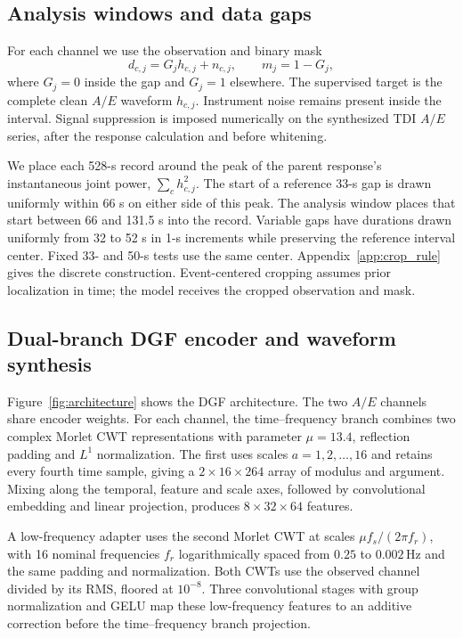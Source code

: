\documentclass[10pt,prd,aps,a4paper,twocolumn,superscriptaddress,nofootinbib,floatfix]{revtex4-2}
\begin{document}
\subsection{Analysis windows and data gaps}\label{sec:gaps}
For each channel we use the observation and binary mask
\begin{equation}
d_{c,j}=G_jh_{c,j}+n_{c,j},\qquad m_j=1-G_j,\label{eq:observation}
\end{equation}
where $G_j=0$ inside the gap and $G_j=1$ elsewhere. The supervised target is the complete clean $A/E$ waveform $h_{c,j}$. Instrument noise remains present inside the interval. Signal suppression is imposed numerically on the synthesized TDI $A/E$ series, after the response calculation and before whitening.

We place each 528-s record around the peak of the parent response's instantaneous joint power, $\sum_c h_{c,j}^2$. The start of a reference 33-s gap is drawn uniformly within 66 s on either side of this peak. The analysis window places that start between 66 and 131.5 s into the record. Variable gaps have durations drawn uniformly from 32 to 52 s in 1-s increments while preserving the reference interval center. Fixed 33- and 50-s tests use the same center. Appendix~\ref{app:crop_rule} gives the discrete construction. Event-centered cropping assumes prior localization in time; the model receives the cropped observation and mask.

\subsection{Dual-branch DGF encoder and waveform synthesis}\label{sec:architecture}
Figure~\ref{fig:architecture} shows the DGF architecture. The two $A/E$ channels share encoder weights. For each channel, the time--frequency branch combines two complex Morlet CWT representations with parameter $\mu=13.4$, reflection padding and $L^1$ normalization. The first uses scales $a=1,2,\ldots,16$ and retains every fourth time sample, giving a $2\times16\times264$ array of modulus and argument. Mixing along the temporal, feature and scale axes, followed by convolutional embedding and linear projection, produces $8\times32\times64$ features.

A low-frequency adapter uses the second Morlet CWT at scales $\mu f_s/(2\pi f_r)$, with 16 nominal frequencies $f_r$ logarithmically spaced from $0.25$ to $0.002\,\mathrm{Hz}$ and the same padding and normalization. Both CWTs use the observed channel divided by its RMS, floored at $10^{-8}$. Three convolutional stages with group normalization and GELU map these low-frequency features to an additive correction before the time--frequency branch projection.
\end{document}
